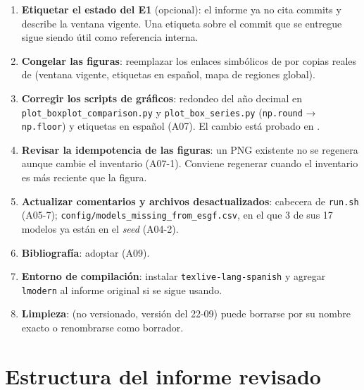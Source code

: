 \begin{enumerate}[leftmargin=1.5em]
\item \textbf{Etiquetar el estado del E1} (opcional): el informe ya no cita commits y describe la ventana vigente. Una etiqueta sobre el commit que se entregue sigue siendo útil como referencia interna.
\item \textbf{Congelar las figuras}: reemplazar los enlaces simbólicos de  por copias reales de  (ventana vigente, etiquetas en español, mapa de regiones global).
\item \textbf{Corregir los scripts de gráficos}: redondeo del año decimal en \texttt{plot\_boxplot\_comparison.py} y \texttt{plot\_box\_series.py} (\texttt{np.round} → \texttt{np.floor}) y etiquetas en español (A07). El cambio está probado en .
\item \textbf{Revisar la idempotencia de las figuras}: un PNG existente no se regenera aunque cambie el inventario (A07-1). Conviene regenerar cuando el inventario es más reciente que la figura.
\item \textbf{Actualizar comentarios y archivos desactualizados}: cabecera de \texttt{run.sh} (A05-7); \texttt{config/models\_missing\_from\_esgf.csv}, en el que 3 de sus 17 modelos ya están en el \emph{seed} (A04-2).
\item \textbf{Bibliografía}: adoptar  (A09).
\item \textbf{Entorno de compilación}: instalar \texttt{texlive-lang-spanish} y agregar \texttt{lmodern} al informe original si se sigue usando.
\item \textbf{Limpieza}:  (no versionado, versión del 22-09) puede borrarse por su nombre exacto o renombrarse como borrador.
\end{enumerate}

\section{Estructura del informe revisado}

